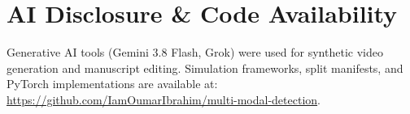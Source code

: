 \documentclass[conference]{IEEEtran}
\begin{document}
\section*{AI Disclosure \& Code Availability}
Generative AI tools (Gemini 3.8 Flash, Grok) were used for synthetic video generation and manuscript editing. Simulation frameworks, split manifests, and PyTorch implementations are available at: \url{https://github.com/IamOumarIbrahim/multi-modal-detection}.



\end{document}
